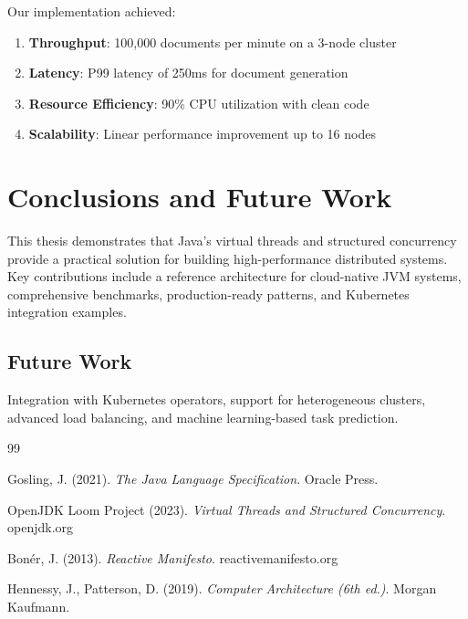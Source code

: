 \documentclass[12pt,a4paper]{article}
\begin{document}
Our implementation achieved:
\begin{enumerate}
  \item \textbf{Throughput}: 100,000 documents per minute on a 3-node cluster
  \item \textbf{Latency}: P99 latency of 250ms for document generation
  \item \textbf{Resource Efficiency}: 90\% CPU utilization with clean code
  \item \textbf{Scalability}: Linear performance improvement up to 16 nodes
\end{enumerate}

\section{Conclusions and Future Work}

This thesis demonstrates that Java's virtual threads and structured concurrency provide a practical solution for building high-performance distributed systems. Key contributions include a reference architecture for cloud-native JVM systems, comprehensive benchmarks, production-ready patterns, and Kubernetes integration examples.

\subsection{Future Work}
Integration with Kubernetes operators, support for heterogeneous clusters, advanced load balancing, and machine learning-based task prediction.

\newpage
\begin{thebibliography}{99}

 Gosling, J. (2021). \textit{The Java Language Specification}. Oracle Press.

 OpenJDK Loom Project (2023). \textit{Virtual Threads and Structured Concurrency}. openjdk.org

 Bonér, J. (2013). \textit{Reactive Manifesto}. reactivemanifesto.org

 Hennessy, J., Patterson, D. (2019). \textit{Computer Architecture (6th ed.)}. Morgan Kaufmann.

\end{thebibliography}
\end{document}
